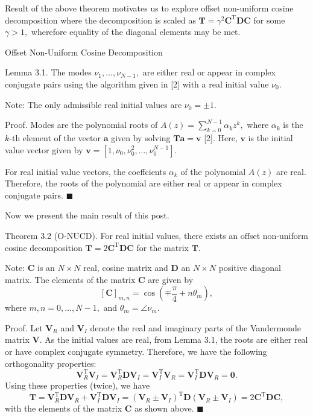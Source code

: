 Result of the above theorem motivates us to explore offset non-uniform cosine decomposition where the decomposition is scaled as $\boldsymbol{T} = \gamma^2 \boldsymbol{C}^\text{T} \boldsymbol{D} \boldsymbol{C}$ for some  $\gamma > 1,$ wherefore equality of the diagonal elements may be met.

Offset Non-Uniform Cosine Decomposition

Lemma 3.1. The modes $\nu_1, \dots, \nu_{N-1},$ are either real or appear in complex conjugate pairs using the algorithm given in [2] with a real initial value $\nu_0.$

Note: The only admissible real initial values are $\nu_0 = \pm 1.$

Proof. Modes are the polynomial roots of $A(z) = \sum_{k=0}^{N-1} \alpha_k z^k,$ where $\alpha_ k$ is the $k$-th element of the vector $\boldsymbol{a}$ given by solving $\boldsymbol{Ta} = \boldsymbol{v}$ [2]. Here, $\boldsymbol{v}$ is the initial value vector given by $\boldsymbol{v} = [1, \nu_0, \nu_0^2,\dots,\nu_0^{N-1}].$

For real initial value vectors, the coeffcients $\alpha_k$ of the polynomial $A(z)$ are real. Therefore, the roots of the polynomial are either real or appear in complex conjugate pairs. $\blacksquare$

Now we present the main result of this post.

Theorem 3.2 (O-NUCD). For real initial values, there exists an offset non-uniform cosine decomposition $\boldsymbol{T} = 2 \boldsymbol{C}^\text{T} \boldsymbol{D} \boldsymbol{C}$ for the matrix $\boldsymbol{T}.$

Note: $\boldsymbol{C}$ is an $N\times N$ real, cosine matrix and $\boldsymbol{D}$ an $N\times N$ positive diagonal matrix. The elements of the matrix $\boldsymbol{C}$ are given by \[
[\boldsymbol{C}]_{m,n} = \cos\left(\mp \frac{\pi}{4} + n \theta_m\right),\] where $m,n = 0,\dots,N-1,$  and $\theta_m = \angle \nu_m.$

Proof. Let $\boldsymbol{V}_R$ and $\boldsymbol{V}_I$ denote the real and imaginary parts of the Vandermonde matrix $\boldsymbol{V}.$ As the initial values are real, from Lemma 3.1, the roots are either real or have complex conjugate symmetry. Therefore, we have the following orthogonality properties: \[\boldsymbol{V}_R^\text{T} \boldsymbol{V}_I = \boldsymbol{V}_R^\text{T} \boldsymbol{D} \boldsymbol{V}_I = \boldsymbol{V}_I^\text{T} \boldsymbol{V}_R = \boldsymbol{V}_I^\text{T} \boldsymbol{D} \boldsymbol{V}_R =\boldsymbol{0}.\] Using these properties (twice), we have \[\boldsymbol{T} =  \boldsymbol{V}_R^\text{T} \boldsymbol{D} \boldsymbol{V}_R +  \boldsymbol{V}_I^\text{T} \boldsymbol{D} \boldsymbol{V}_I = (\boldsymbol{V}_R \pm \boldsymbol{V}_I)^\text{T} \boldsymbol{D} (\boldsymbol{V}_R \pm \boldsymbol{V}_I) = 2 \boldsymbol{C}^\text{T} \boldsymbol{D} \boldsymbol{C},\] with the elements of the matrix $\boldsymbol{C}$ as shown above. $\blacksquare$

